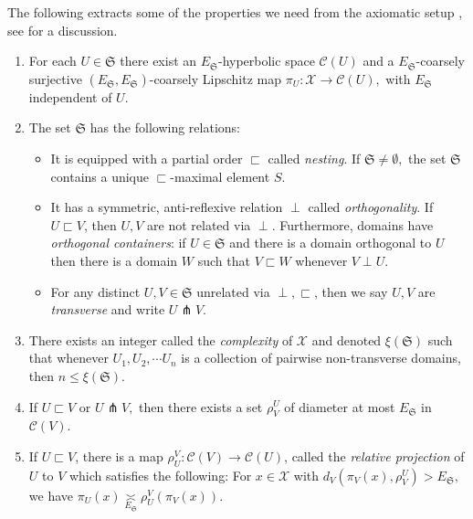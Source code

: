 \documentclass{amsart}
\theoremstyle{definition}
\theoremstyle{remark}
\theoremstyle{definition}
\newcommand{\calC}{\mathcal{C}}
\newcommand{\calX}{\mathcal{X}}
\newcommand{\ES}{E_{\mathfrak S}}
\newcommand{\nest}{\sqsubset}
\begin{document}
The following extracts some of the properties we need from the axiomatic setup \cite{HHS_II}, see \cite{Sisto_HHS} for a discussion.


\begin{enumerate}

\item For each $U \in \mathfrak S$ there exist an $\ES$-hyperbolic space $\calC(U
)$ and a $\ES$-coarsely surjective $(\ES,\ES)$-coarsely Lipschitz map $\pi_U: \calX \rightarrow \calC(U),$ with $\ES$ independent of $U$.

    \item The set $\mathfrak S$ has the following relations:
    \begin{itemize}
        \item It is equipped with a partial order $\nest$ called \emph{nesting}. If $\mathfrak S \neq \emptyset,$ the set $\mathfrak S$ contains a unique $\nest$-maximal element $S.$
        
        \item It has a symmetric, anti-reflexive relation $\perp$ called \emph{orthogonality}. If $U \nest V$, then $U,V$ are not related via $\perp$. Furthermore, domains have \emph{orthogonal containers}: if $U \in \mathfrak S$ and there is a domain orthogonal to $U$ then there is a domain $W$ such that $V \nest W$ whenever $V \perp U.$
        
        \item For any distinct $ U, V \in \mathfrak S$ unrelated via $\perp, \nest$, then we say $U,V$ are \emph{transverse} and write $U  \pitchfork V.$ 
     
        \end{itemize}
          
        \item There exists an integer called the \emph{complexity} of $\calX$ and denoted $\xi(\mathfrak S)$ such that whenever $U_1,U_2,\cdots U_n$ is a collection of pairwise non-transverse domains, then $n \leq \xi(\mathfrak S).$
        
        \item If $U  \sqsubset V$ or $U  \pitchfork V,$ then there exists a set $\rho^U_V$ of diameter at most $\ES$ in $\calC(V)$.
        
        \item If $U  \sqsubset V$, there is a map $\rho^V_U:\calC(V) \rightarrow \calC(U)$, called the \emph{relative projection} of $U$ to $V$ which satisfies the following: For $x \in \calX$ with $d_{ V}(\pi_V(x),\rho^U_V)>\ES,$ we have $\pi_U(x) \underset{\ES}{\asymp} \rho^V_U(\pi_V(x)).$

        
        


\end{enumerate}
\end{document}

